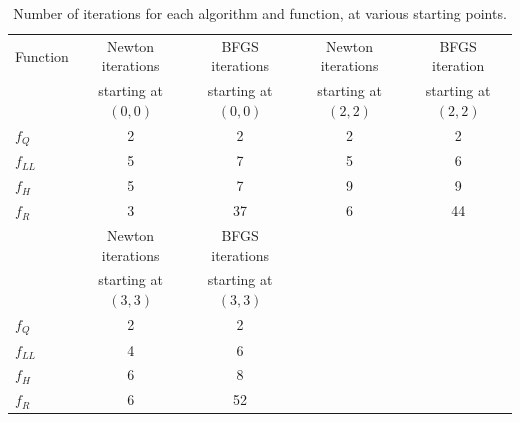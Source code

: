 \documentclass[11pt]{article}
\begin{document}
\begin{enumerate}[(a)]
\begin{table}
\centering
\begin{tabular}[h]{lcccc}
Function    & Newton iterations     & BFGS iterations       & Newton iterations     & BFGS iteration        \\
            & starting at $(0,0)$   & starting at $(0,0)$   & starting at $(2,2)$   & starting at $(2,2)$   \\
\hline
$f_Q$       & 2                     & 2                     & 2                     & 2                     \\
$f_{LL}$    & 5                     & 7                     & 5                     & 6                     \\
$f_H$       & 5                     & 7                     & 9                     & 9                     \\
$f_R$       & 3                     & 37                    & 6                     & 44                    \\
\hline
            & Newton iterations     & BFGS iterations       &                       &                       \\
            & starting at $(3,3)$   & starting at $(3,3)$   &                       &                       \\
\hline
$f_Q$       & 2                     &  2                    &                       &                       \\
$f_{LL}$    & 4                     &  6                    &                       &                       \\
$f_H$       & 6                     &  8                    &                       &                       \\
$f_R$       & 6                     & 52                    &                       &                       \\
\end{tabular}
\caption{Number of iterations for each algorithm and function, at various
starting points.}
\label{tab:3d}
\end{table}
\end{enumerate}
\end{document}
